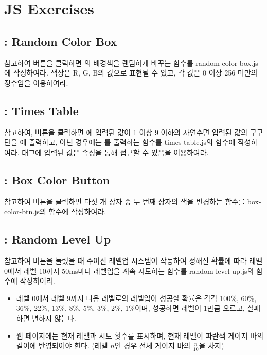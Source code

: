 \section{JS Exercises}\label{sect:js-exercises}

\subsection*{: Random Color Box}

\을 참고하여 버튼을 클릭하면 의 배경색을 랜덤하게 바꾸는  함수를 random-color-box.js에 작성하여라. 색상은 R, G, B의 값으로 표현될 수 있고, 각 값은 0 이상 256 미만의 정수임을 이용하여라.

\subsection*{: Times Table}

\을 참고하여, 버튼을 클릭하면 에 입력된 값이 1 이상 9 이하의 자연수면 입력된 값의 구구단을 에 출력하고, 아닌 경우에는 를 출력하는 함수를 times-table.js의  함수에 작성하여라.  태그에 입력된 값은  속성을 통해 접근할 수 있음을 이용하여라.

\subsection*{: Box Color Button}

\을 참고하여 버튼을 클릭하면 다섯 개 상자 중 두 번째 상자의 색을 변경하는 함수를 box-color-btn.js의  함수에 작성하여라.

\subsection*{: Random Level Up}

\을 참고하여 버튼을 눌렀을 때 주어진 레벨업 시스템이 작동하여 정해진 확률에 따라 레벨 0에서 레벨 10까지 50ms마다 레벨업을 계속 시도하는 함수를 random-level-up.js의  함수에 작성하여라.

\begin{itemize}
    \item 레벨 0에서 레벨 9까지 다음 레벨로의 레벨업이 성공할 확률은 각각 100\%, 60\%, 36\%, 22\%, 13\%, 8\%, 5\%, 3\%, 2\%, 1\%이며, 성공하면 레벨이 1만큼 오르고, 실패하면 변하지 않는다.
    \item 웹 페이지에는 현재 레벨과 시도 횟수를 표시하며, 현재 레벨이 파란색 게이지 바의 길이에 반영되어야 한다. (레벨 $n$인 경우 전체 게이지 바의 $\frac{n}{10}$을 차지)
\end{itemize}


